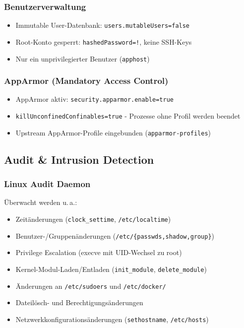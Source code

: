 \subsubsection*{Benutzerverwaltung}
\begin{itemize}
  \item Immutable User-Datenbank: \texttt{users.mutableUsers=false}
  \item Root-Konto gesperrt: \texttt{hashedPassword=\textquotedbl!\textquotedbl}, keine SSH-Keys
  \item Nur ein unprivilegierter Benutzer (\texttt{apphost})
\end{itemize}

\subsubsection*{AppArmor (Mandatory Access Control)}
\begin{itemize}
  \item AppArmor aktiv: \texttt{security.apparmor.enable=true}
  \item \texttt{killUnconfinedConfinables=true} - Prozesse ohne Profil werden beendet
  \item Upstream AppArmor-Profile eingebunden (\texttt{apparmor-profiles})
\end{itemize}


\subsection{Audit \& Intrusion Detection}
\subsubsection*{Linux Audit Daemon}
Überwacht werden u.\,a.:
\begin{itemize}
  \item Zeitänderungen (\texttt{clock\_settime}, \texttt{/etc/localtime})
  \item Benutzer-/Gruppenänderungen (\texttt{/etc/\{passwds,shadow,group\}})
  \item Privilege Escalation (execve mit UID-Wechsel zu root)
  \item Kernel-Modul-Laden/Entladen (\texttt{init\_module}, \texttt{delete\_module})
  \item Änderungen an \texttt{/etc/sudoers} und \texttt{/etc/docker/}
  \item Dateilösch- und Berechtigungsänderungen
  \item Netzwerkkonfigurationsänderungen (\texttt{sethostname}, \texttt{/etc/hosts})
\end{itemize}

